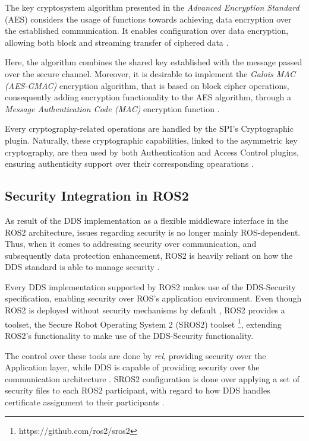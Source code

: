 The key cryptosystem algorithm \cite{takemoto2019performance} presented in the \textit{Advanced Encryption Standard} (AES) considers the usage of functions towards achieving data encryption over the established communication. It enables configuration over data encryption, allowing both block and streaming transfer of ciphered data \cite{diluoffo2018robot}.

Here, the algorithm combines the shared key established with the message passed over the secure channel. Moreover, it is desirable to implement the \textit{Galois MAC (AES-GMAC)} encryption algorithm, that is based on block cipher operations, consequently adding encryption functionality to the AES algorithm, through a \textit{Message Authentication Code (MAC)} encryption function \cite{takemoto2019performance, kim2018security}.

Every cryptography-related operations are handled by the SPI's Cryptographic plugin. Naturally, these cryptographic capabilities, linked to the asymmetric key cryptography, are then used by both Authentication and Access Control plugins, ensuring authenticity support over their corresponding opearations \cite{ros-dds-integration, diluoffo2018robot}.

\subsection{Security Integration in ROS2}

As result of the DDS implementation as a flexible middleware interface in the ROS2 architecture, issues regarding security is no longer mainly ROS-dependent. Thus, when it comes to addressing security over communication, and subsequently data protection enhancement, ROS2 is heavily reliant on how the DDS standard is able to manage security \cite{kim2018security, 8794451}.

Every DDS implementation supported by ROS2 makes use of the DDS-Security specification, enabling security over ROS's application environment. Even though ROS2 is deployed without security mechanisms by default \cite{ros-dds-integration}, ROS2 provides a toolset, the Secure Robot Operating System 2 (SROS2) toolset \footnote{https://github.com/ros2/sros2}, extending ROS2's functionality to make use of the DDS-Security functionality. 

The control over these tools are done by \textit{rcl}, providing security over the Application layer, while DDS is capable of providing security over the communication architecture \cite{kim2018security}. SROS2 configuration is done over applying a set of security files to each ROS2 participant, with regard to how DDS handles certificate assignment to their participants \cite{white2016sros, ros-dds-integration}. 

